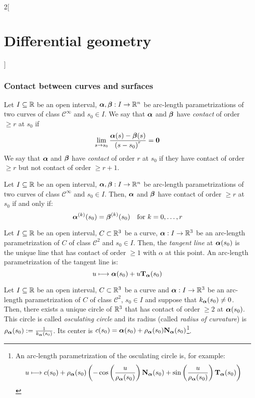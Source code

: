 \documentclass[../../../main.tex]{subfiles}
\begin{document}
\begin{multicols}{2}[\section{Differential geometry}]
  \subsubsection{Contact between curves and surfaces}
  \begin{definition}
    Let $I\subseteq\mathbb{R}$ be an open interval, $\boldsymbol{\mathrm{\alpha}},\boldsymbol{\mathrm{\beta}}:I\rightarrow\mathbb{R}^n$ be arc-length parametrizations of two curves of class $\mathcal{C}^\infty$ and $s_0\in I$. We say that $\boldsymbol{\mathrm{\alpha}}$ and $\boldsymbol{\mathrm{\beta}}$ have \emph{contact} of order $\geq r$ at $s_0$ if $$\lim_{s\to s_0}\frac{\boldsymbol{\mathrm{\alpha}}(s)-\boldsymbol{\mathrm{\beta}}(s)}{{(s-s_0)}^r}=\boldsymbol{\mathrm{0}}$$
    We say that $\boldsymbol{\mathrm{\alpha}}$ and $\boldsymbol{\mathrm{\beta}}$ have \emph{contact} of order $r$ at $s_0$ if they have contact of order $\geq r$ but not contact of order $\geq r+1$.
  \end{definition}
  \begin{proposition}
    Let $I\subseteq\mathbb{R}$ be an open interval, $\boldsymbol{\mathrm{\alpha}},\boldsymbol{\mathrm{\beta}}:I\rightarrow\mathbb{R}^n$ be arc-length parametrizations of two curves of class $\mathcal{C}^\infty$ and $s_0\in I$. Then, $\boldsymbol{\mathrm{\alpha}}$ and $\boldsymbol{\mathrm{\beta}}$ have contact of order $\geq r$ at $s_0$ if and only if: $$\boldsymbol{\mathrm{\alpha}}^{(k)}(s_0)=\boldsymbol{\mathrm{\beta}}^{(k)}(s_0)\quad\text{for }k=0,\ldots,r$$
  \end{proposition}
  \begin{proposition}
    Let $I\subseteq\mathbb{R}$ be an open interval, $C\subset\mathbb{R}^3$ be a curve, $\boldsymbol{\mathrm{\alpha}}:I\rightarrow\mathbb{R}^3$ be an arc-length parametrization of $C$ of class $\mathcal{C}^2$ and $s_0\in I$. Then, the \emph{tangent line} at $\boldsymbol{\mathrm{\alpha}}(s_0)$ is the unique line that has contact of order $\geq 1$ with $\alpha$ at this point. An arc-length parametrization of the tangent line is: $$u\longmapsto \boldsymbol{\mathrm{\alpha}}(s_0)+u{\boldsymbol{\mathrm{T}}_{\boldsymbol{\mathrm{\alpha}}}}(s_0)$$
  \end{proposition}
  \begin{proposition}
    Let $I\subseteq\mathbb{R}$ be an open interval, $C\subset\mathbb{R}^3$ be a curve and $\boldsymbol{\mathrm{\alpha}}:I\rightarrow\mathbb{R}^3$ be an arc-length parametrization of $C$ of class $\mathcal{C}^2$, $s_0\in I$ and suppose that $k_{\boldsymbol{\mathrm{\alpha}}}(s_0)\ne 0$. Then, there exists a unique circle of $\mathbb{R}^3$ that has contact of order $\geq 2$ at $\boldsymbol{\mathrm{\alpha}}(s_0)$. This circle is called \emph{osculating circle} and its radius (called \emph{radius of curvature}) is $\rho_{\boldsymbol{\mathrm{\alpha}}}(s_0):=\frac{1}{k_{\boldsymbol{\mathrm{\alpha}}}(s_0)}$. Its center is $c(s_0)=\boldsymbol{\mathrm{\alpha}}(s_0)+\rho_{\boldsymbol{\mathrm{\alpha}}}(s_0){\boldsymbol{\mathrm{N}}_{\boldsymbol{\mathrm{\alpha}}}}(s_0)$\footnote{An arc-length parametrization of the osculating circle is, for example: $$u\longmapsto c(s_0)+\rho_{\boldsymbol{\mathrm{\alpha}}}(s_0)\left(-\cos\left(\frac{u}{\rho_{\boldsymbol{\mathrm{\alpha}}}(s_0)}\right){\boldsymbol{\mathrm{N}}_{\boldsymbol{\mathrm{\alpha}}}}(s_0)+\sin\left(\frac{u}{\rho_{\boldsymbol{\mathrm{\alpha}}}(s_0)}\right){\boldsymbol{\mathrm{T}}_{\boldsymbol{\mathrm{\alpha}}}}(s_0)\right)$$}.

\end{proposition}
\end{multicols}
\end{document}
